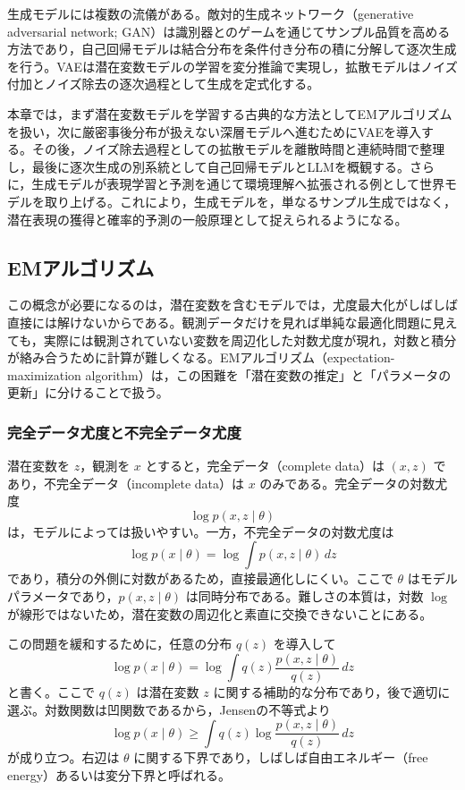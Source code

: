 生成モデルには複数の流儀がある。敵対的生成ネットワーク（generative adversarial network; GAN）は識別器とのゲームを通じてサンプル品質を高める方法であり，自己回帰モデルは結合分布を条件付き分布の積に分解して逐次生成を行う。VAEは潜在変数モデルの学習を変分推論で実現し，拡散モデルはノイズ付加とノイズ除去の逐次過程として生成を定式化する。

本章では，まず潜在変数モデルを学習する古典的な方法としてEMアルゴリズムを扱い，次に厳密事後分布が扱えない深層モデルへ進むためにVAEを導入する。その後，ノイズ除去過程としての拡散モデルを離散時間と連続時間で整理し，最後に逐次生成の別系統として自己回帰モデルとLLMを概観する。さらに，生成モデルが表現学習と予測を通じて環境理解へ拡張される例として世界モデルを取り上げる。これにより，生成モデルを，単なるサンプル生成ではなく，潜在表現の獲得と確率的予測の一般原理として捉えられるようになる。

\subsection{EMアルゴリズム}

この概念が必要になるのは，潜在変数を含むモデルでは，尤度最大化がしばしば直接には解けないからである。観測データだけを見れば単純な最適化問題に見えても，実際には観測されていない変数を周辺化した対数尤度が現れ，対数と積分が絡み合うために計算が難しくなる。EMアルゴリズム（expectation-maximization algorithm）は，この困難を「潜在変数の推定」と「パラメータの更新」に分けることで扱う。

\subsubsection{完全データ尤度と不完全データ尤度}

潜在変数を \(z\)，観測を \(x\) とすると，完全データ（complete data）は \((x,z)\) であり，不完全データ（incomplete data）は \(x\) のみである。完全データの対数尤度
\[
\log p(x,z \mid \theta)
\]
は，モデルによっては扱いやすい。一方，不完全データの対数尤度は
\[
\log p(x \mid \theta) = \log \int p(x,z \mid \theta)\, dz
\]
であり，積分の外側に対数があるため，直接最適化しにくい。ここで \(\theta\) はモデルパラメータであり，\(p(x,z \mid \theta)\) は同時分布である。難しさの本質は，対数 \(\log\) が線形ではないため，潜在変数の周辺化と素直に交換できないことにある。

この問題を緩和するために，任意の分布 \(q(z)\) を導入して
\[
\log p(x \mid \theta)
= \log \int q(z)\frac{p(x,z \mid \theta)}{q(z)}\, dz
\]
と書く。ここで \(q(z)\) は潜在変数 \(z\) に関する補助的な分布であり，後で適切に選ぶ。対数関数は凹関数であるから，Jensenの不等式より
\[
\log p(x \mid \theta)
\ge
\int q(z)\log \frac{p(x,z \mid \theta)}{q(z)}\, dz
\]
が成り立つ。右辺は \(\theta\) に関する下界であり，しばしば自由エネルギー（free energy）あるいは変分下界と呼ばれる。

